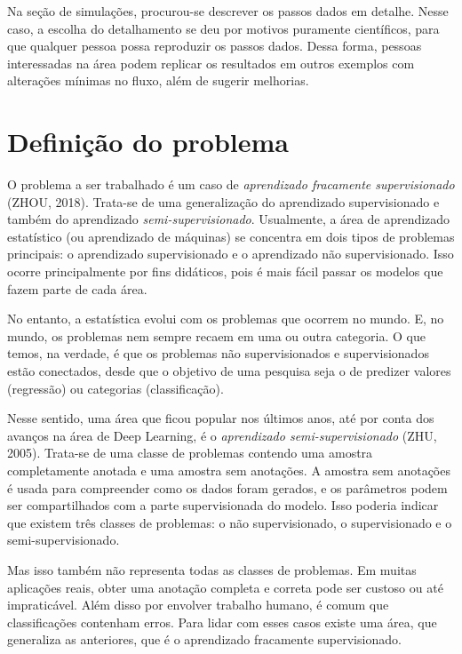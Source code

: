 \documentclass[12pt,twoside,brazilian]{book}
\begin{document}
Na seção de simulações, procurou-se descrever os passos dados em
detalhe. Nesse caso, a escolha do detalhamento se deu por motivos
puramente científicos, para que qualquer pessoa possa reproduzir os
passos dados. Dessa forma, pessoas interessadas na área podem replicar
os resultados em outros exemplos com alterações mínimas no fluxo, além
de sugerir melhorias.

\hypertarget{definiuxe7uxe3o-do-problema}{%
\section{Definição do problema}\label{definiuxe7uxe3o-do-problema}}

O problema a ser trabalhado é um caso de \emph{aprendizado fracamente
supervisionado} (ZHOU, 2018). Trata-se de uma generalização do
aprendizado supervisionado e também do aprendizado
\emph{semi-supervisionado}. Usualmente, a área de aprendizado
estatístico (ou aprendizado de máquinas) se concentra em dois tipos de
problemas principais: o aprendizado supervisionado e o aprendizado não
supervisionado. Isso ocorre principalmente por fins didáticos, pois é
mais fácil passar os modelos que fazem parte de cada área.

No entanto, a estatística evolui com os problemas que ocorrem no mundo.
E, no mundo, os problemas nem sempre recaem em uma ou outra categoria. O
que temos, na verdade, é que os problemas não supervisionados e
supervisionados estão conectados, desde que o objetivo de uma pesquisa
seja o de predizer valores (regressão) ou categorias (classificação).

Nesse sentido, uma área que ficou popular nos últimos anos, até por
conta dos avanços na área de Deep Learning, é o \emph{aprendizado
semi-supervisionado} (ZHU, 2005). Trata-se de uma classe de problemas
contendo uma amostra completamente anotada e uma amostra sem anotações.
A amostra sem anotações é usada para compreender como os dados foram
gerados, e os parâmetros podem ser compartilhados com a parte
supervisionada do modelo. Isso poderia indicar que existem três classes
de problemas: o não supervisionado, o supervisionado e o
semi-supervisionado.

Mas isso também não representa todas as classes de problemas. Em muitas
aplicações reais, obter uma anotação completa e correta pode ser custoso
ou até impraticável. Além disso por envolver trabalho humano, é comum
que classificações contenham erros. Para lidar com esses casos existe
uma área, que generaliza as anteriores, que é o aprendizado fracamente
supervisionado.
\end{document}
